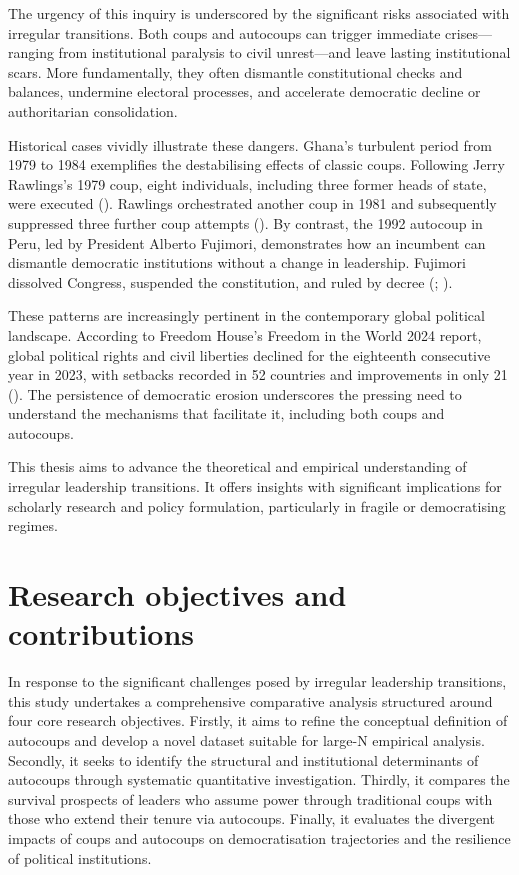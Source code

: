 \documentclass[
  12pt,
]{report}
\begin{document}
The urgency of this inquiry is underscored by the significant risks
associated with irregular transitions. Both coups and autocoups can
trigger immediate crises---ranging from institutional paralysis to civil
unrest---and leave lasting institutional scars. More fundamentally, they
often dismantle constitutional checks and balances, undermine electoral
processes, and accelerate democratic decline or authoritarian
consolidation.

Historical cases vividly illustrate these dangers. Ghana's turbulent
period from 1979 to 1984 exemplifies the destabilising effects of
classic coups. Following Jerry Rawlings's 1979 coup, eight individuals,
including three former heads of state, were executed
(). Rawlings orchestrated
another coup in 1981 and subsequently suppressed three further coup
attempts (). By contrast, the
1992 autocoup in Peru, led by President Alberto Fujimori, demonstrates
how an incumbent can dismantle democratic institutions without a change
in leadership. Fujimori dissolved Congress, suspended the constitution,
and ruled by decree (;
).

These patterns are increasingly pertinent in the contemporary global
political landscape. According to Freedom House's Freedom in the World
2024 report, global political rights and civil liberties declined for
the eighteenth consecutive year in 2023, with setbacks recorded in 52
countries and improvements in only 21
(). The
persistence of democratic erosion underscores the pressing need to
understand the mechanisms that facilitate it, including both coups and
autocoups.

This thesis aims to advance the theoretical and empirical understanding
of irregular leadership transitions. It offers insights with significant
implications for scholarly research and policy formulation, particularly
in fragile or democratising regimes.

\section{Research objectives and
contributions}\label{research-objectives-and-contributions}

In response to the significant challenges posed by irregular leadership
transitions, this study undertakes a comprehensive comparative analysis
structured around four core research objectives. Firstly, it aims to
refine the conceptual definition of autocoups and develop a novel
dataset suitable for large-N empirical analysis. Secondly, it seeks to
identify the structural and institutional determinants of autocoups
through systematic quantitative investigation. Thirdly, it compares the
survival prospects of leaders who assume power through traditional coups
with those who extend their tenure via autocoups. Finally, it evaluates
the divergent impacts of coups and autocoups on democratisation
trajectories and the resilience of political institutions.
\end{document}
